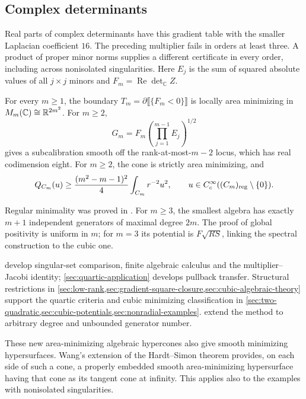 \subsection{Complex determinants}
\label{subsec:intro-determinants}

Real parts of complex determinants have this gradient table with the
smaller Laplacian coefficient $16$. The preceding multiplier fails in
orders at least three. A product of proper minor norms supplies a
different certificate in every order, including across nonisolated
singularities. Here $E_j$ is the sum of squared absolute values of all
$j\times j$ minors and $F_m=\operatorname{Re}\det_{\mathbb C}Z$.

\begin{maintheorem}
\label{main:complex-determinants}
For every $m\ge1$, the boundary
$T_m=\partial\llbracket\{F_m<0\}\rrbracket$ is locally area
minimizing in $M_m(\mathbb C)\cong\mathbb R^{2m^2}$. For $m\ge2$,
\[
 G_m=F_m\left(\prod_{j=1}^{m-1}E_j\right)^{1/2}
\]
gives a subcalibration smooth off the rank-at-most-$m-2$ locus,
which has real codimension eight. For $m\ge2$, the cone is strictly area minimizing,
and
\begin{equation}\label{eq:main-determinant-stability}
 Q_{C_m}(u)\ge\frac{(m^2-m-1)^2}{4}\int_{C_m}r^{-2}u^2,
 \qquad u\in C_c^\infty((C_m)_{\mathrm{reg}}\setminus\{0\}).
\end{equation}
\end{maintheorem}
Regular minimality was proved in
\cite[Corollary~5.2 and Example~5.4]{HoppeTkachev19}.
For $m\ge3$, the smallest algebra has exactly $m+1$ independent
generators of maximal degree $2m$. The proof of global positivity
is uniform in $m$; for $m=3$ its potential is $F\sqrt{RS}$,
linking the spectral construction to the cubic one.

develop singular-set comparison, finite algebraic calculus and the
multiplier--Jacobi identity; \cref{sec:quartic-application} develops
pullback transfer. Structural restrictions in
\cref{sec:low-rank,sec:gradient-square-closure,sec:cubic-algebraic-theory}
support the quartic criteria and cubic minimizing classification in
\cref{sec:two-quadratic,sec:cubic-potentials,sec:nonradial-examples}.
extend the method to arbitrary degree and unbounded generator number.

\begin{remark}
These new area-minimizing algebraic hypercones also give smooth
minimizing hypersurfaces. Wang's extension
\cite[Theorem~1.1]{WangSmoothing24} of the Hardt--Simon theorem
\cite{HardtSimon85} provides, on each side of such a cone, a properly
embedded smooth area-minimizing hypersurface having that cone as its
tangent cone at infinity. This applies also to the examples with
nonisolated singularities.
\end{remark}

